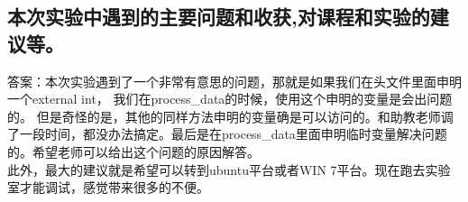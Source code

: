 \documentclass{article}
\begin{document}
\begin{CJK}{UTF8}{gbsn}
\subsection{本次实验中遇到的主要问题和收获,对课程和实验的建议等。}
答案：本次实验遇到了一个非常有意思的问题，那就是如果我们在头文件里面申明一个external int，
我们在process\_data的时候，使用这个申明的变量是会出问题的。
但是奇怪的是，其他的同样方法申明的变量确是可以访问的。和助教老师调了一段时间，都没办法搞定。最后是在process\_data里面申明临时变量解决问题的。希望老师可以给出这个问题的原因解答。\\
此外，最大的建议就是希望可以转到ubuntu平台或者WIN 7平台。现在跑去实验室才能调试，感觉带来很多的不便。




\end{CJK}
\end{document}
